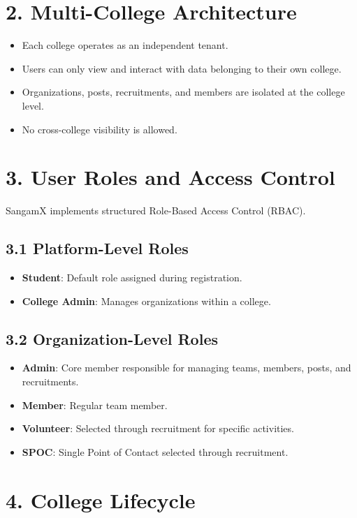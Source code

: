 \documentclass[12pt]{article}
\begin{document}
\section*{2. Multi-College Architecture}

\begin{itemize}
    \item Each college operates as an independent tenant.
    \item Users can only view and interact with data belonging to their own college.
    \item Organizations, posts, recruitments, and members are isolated at the college level.
    \item No cross-college visibility is allowed.
\end{itemize}

\section*{3. User Roles and Access Control}

SangamX implements structured Role-Based Access Control (RBAC).

\subsection*{3.1 Platform-Level Roles}
\begin{itemize}
    \item \textbf{Student}: Default role assigned during registration.
    \item \textbf{College Admin}: Manages organizations within a college.
\end{itemize}

\subsection*{3.2 Organization-Level Roles}
\begin{itemize}
    \item \textbf{Admin}: Core member responsible for managing teams, members, posts, and recruitments.
    \item \textbf{Member}: Regular team member.
    \item \textbf{Volunteer}: Selected through recruitment for specific activities.
    \item \textbf{SPOC}: Single Point of Contact selected through recruitment.
\end{itemize}

\section*{4. College Lifecycle}
\end{document}
